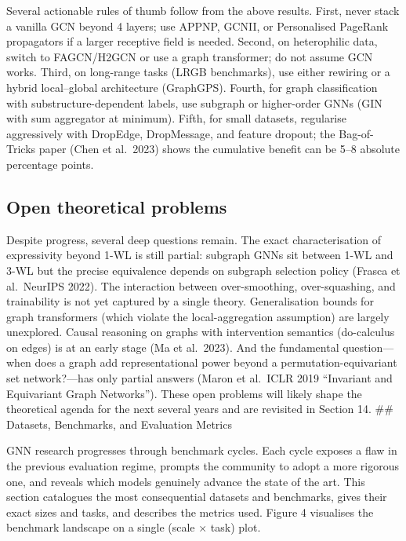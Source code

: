 Several actionable rules of thumb follow from the above results. First, never stack a vanilla GCN beyond 4 layers; use APPNP, GCNII, or Personalised PageRank propagators if a larger receptive field is needed. Second, on heterophilic data, switch to FAGCN/H2GCN or use a graph transformer; do not assume GCN works. Third, on long-range tasks (LRGB benchmarks), use either rewiring or a hybrid local--global architecture (GraphGPS). Fourth, for graph classification with substructure-dependent labels, use subgraph or higher-order GNNs (GIN with sum aggregator at minimum). Fifth, for small datasets, regularise aggressively with DropEdge, DropMessage, and feature dropout; the Bag-of-Tricks paper (Chen et al.~2023) shows the cumulative benefit can be 5--8 absolute percentage points.

\subsection{Open theoretical problems}\label{open-theoretical-problems}

Despite progress, several deep questions remain. The exact characterisation of expressivity beyond 1-WL is still partial: subgraph GNNs sit between 1-WL and 3-WL but the precise equivalence depends on subgraph selection policy (Frasca et al.~NeurIPS 2022). The interaction between over-smoothing, over-squashing, and trainability is not yet captured by a single theory. Generalisation bounds for graph transformers (which violate the local-aggregation assumption) are largely unexplored. Causal reasoning on graphs with intervention semantics (do-calculus on edges) is at an early stage (Ma et al.~2023). And the fundamental question---when does a graph add representational power beyond a permutation-equivariant set network?---has only partial answers (Maron et al.~ICLR 2019 ``Invariant and Equivariant Graph Networks''). These open problems will likely shape the theoretical agenda for the next several years and are revisited in Section 14.
\#\# Datasets, Benchmarks, and Evaluation Metrics

GNN research progresses through benchmark cycles. Each cycle exposes a flaw in the previous evaluation regime, prompts the community to adopt a more rigorous one, and reveals which models genuinely advance the state of the art. This section catalogues the most consequential datasets and benchmarks, gives their exact sizes and tasks, and describes the metrics used. Figure 4 visualises the benchmark landscape on a single (scale × task) plot.

